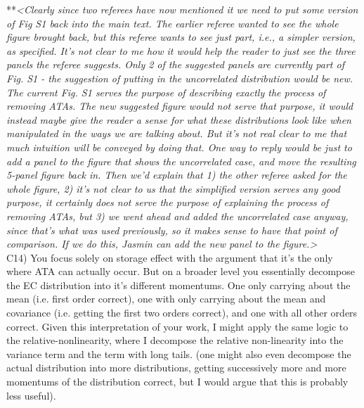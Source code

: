 \documentclass[letterpaper,11pt]{article}
\begin{document}
\noindent ***\emph{<Clearly since two referees have now mentioned it we need to put some version of Fig S1 back into the
main text. The earlier referee wanted to see the whole figure brought back, but this referee wants to see just part, i.e.,
a simpler version, as specified. It's not clear to me how it would help the reader to just see the three panels the referee
suggests. Only 2 of the suggested panels are currently part of Fig. S1 - the suggestion of putting in the uncorrelated
distribution would be new. The current Fig. S1 serves the purpose of describing exactly the process of removing ATAs. 
The new suggested figure would not serve that purpose, it would instead maybe give the reader a sense for what these
distributions look like when manipulated in the ways we are talking about. But it's not real clear to me that much
intuition will be conveyed by doing that. One way to reply would be just to add a panel to the figure that shows 
the uncorrelated case, and move the resulting 5-panel figure back in. Then we'd explain that 1) the other referee asked
for the whole figure, 2) it's not clear to us that the simplified version serves any good purpose, it certainly 
does not serve the purpose of explaining the process of removing ATAs, but 3) we went ahead and added the uncorrelated
case anyway, since that's what was used previously, so it makes sense to have that point of comparison. If we do
this, Jasmin can add the new panel to the figure.>} \\

\noindent C14) You focus solely on storage effect with the argument that it’s the only where ATA can actually occur. But on a broader level you essentially decompose the EC distribution into it’s different momentums. One only carrying about the mean (i.e. first order correct), one with only carrying about the mean and covariance (i.e. getting the first two orders correct), and one with all other orders correct. Given this interpretation of your work, I might apply the same logic to the relative-nonlinearity, where I decompose the relative non-linearity into the variance term and the term with long tails. (one might also even decompose the actual distribution into more distributions, getting successively more and more momentums of the distribution correct, but I would argue that this is probably less useful). \\
\end{document}
